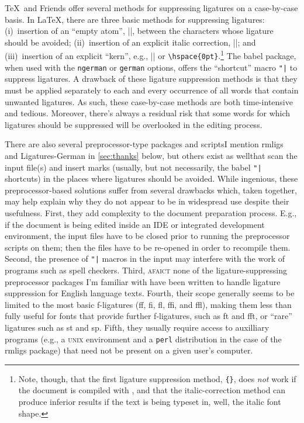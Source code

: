 \documentclass[11pt]{article}
\newcommand{\pkg}[1]{\textsf{#1}}
\newcommand{\opt}[1]{\texttt{#1}}
\begin{document}
\TeX\ and Friends offer several methods for suppressing ligatures on a case-by-case basis. In \LaTeX, there are three basic methods for suppressing ligatures: (i)~insertion of an \enquote{empty atom}, |{}|, between the characters whose ligature should be avoided; (ii)~insertion of an explicit italic correction, |\/|; and (iii)~insertion of an explicit \enquote{kern}, e.g., |\kern0pt| or \Verb/\hspace{0pt}/.\footnote{Note, though, that the first ligature suppression method, \Verb/{}/, does \emph{not} work if the document is compiled with \LuaLaTeX, and that the italic-correction method can produce inferior results if the text is being typeset in, well, the italic font shape.} The \pkg{babel} package, when used with the \opt{ngerman} or \opt{german} options, offers the \enquote{shortcut} macro \Verb/"|/ to suppress ligatures. A drawback of these ligature suppression methods is that they must be applied separately to each and every occurrence of all words that contain unwanted ligatures. As such, these case-by-case methods are both time-intensive and tedious. Moreover, there's always a residual risk that some words for which ligatures should be suppressed will be overlooked in the editing process. 

There are also several preprocessor-type packages and scripts\textemdash I mention \pkg{rmligs} and \pkg{Ligatures-German} in \cref{sec:thanks} below, but others exist as well\textemdash that scan the input file(s) and insert marks (usually, but not necessarily, the \pkg{babel} \Verb/"|/ shortcuts) in the places where ligatures should be avoided. While ingenious, these preprocessor-based solutions suffer from several drawbacks which, taken together, may help explain why they do not appear to be in widespread use despite their usefulness. First, they add complexity to the document preparation process. E.g., if the document is being edited inside an IDE or integrated development environment, the input files have to be closed prior to running the preprocessor scripts on them; then the files have to be re-opened in order to recompile them. Second, the presence of \Verb+"|+ macros in the input may interfere with the work of programs such as spell checkers. Third, \textsc{afaict} none of the ligature-suppressing preprocessor packages I'm familiar with have been written to handle ligature suppression for English language texts. Fourth, their scope generally seems to be limited to the most basic f-ligatures (ff, fi, fl, ffi, and ffl), making them less than fully useful for fonts that provide further f-ligatures, such as ft and fft, or \enquote{rare} ligatures such as st and sp. Fifth, they usually require access to auxilliary programs (e.g., a \textsc{unix} environment and a \opt{perl} distribution in the case of the \pkg{rmligs} package) that need not be present on a given user's computer. 
\end{document}

